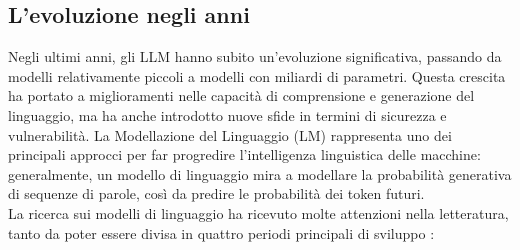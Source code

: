 \subsection{L'evoluzione negli anni}
Negli ultimi anni, gli LLM hanno subito un'evoluzione significativa, passando da modelli relativamente piccoli a modelli con miliardi di parametri. Questa crescita ha portato a miglioramenti nelle capacità di comprensione e generazione del linguaggio, ma ha anche introdotto nuove sfide in termini di sicurezza e vulnerabilità.
La Modellazione del Linguaggio (LM) rappresenta uno dei principali approcci per far progredire l'intelligenza linguistica delle macchine: generalmente, un modello di linguaggio mira a modellare la probabilità generativa di sequenze di parole, così da predire le probabilità dei token futuri.\\
La ricerca sui modelli di linguaggio ha ricevuto molte attenzioni nella letteratura, tanto da poter essere divisa in quattro periodi principali di sviluppo \cite{surveylargelanguagemodels}:
